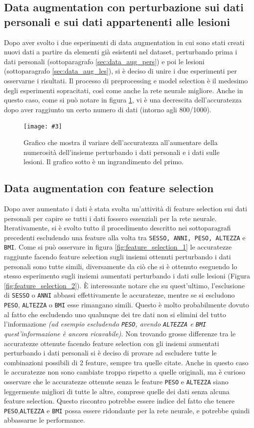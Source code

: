 \documentclass[12pt, twoside, letterpaper]{report}
\newcommand{\img}[4] {
	\begin{figure}
		\centering
		\texttt{[image: \#3]}\\
		\caption{#1}
		\label{fig:#4}
	\end{figure}
}
\begin{document}
		\subsection{Data augmentation con perturbazione sui dati personali e sui dati appartenenti alle lesioni}
			Dopo aver svolto i due esperimenti di data augmentation in cui sono stati creati nuovi dati a partire da elementi già esistenti nel dataset, perturbando prima i dati personali (sottoparagrafo \ref{sec:data_aug_pers}) e poi le lesioni (sottoparagrafo \ref{sec:data_aug_les}), si è deciso di unire i due esperimenti per osservarne i risultati. Il processo di preprocessing e model selection è il medesimo degli esperimenti sopracitati, così come anche la rete neurale migliore. Anche in questo caso, come si può notare in figura \ref{fig:acc_data_aug_both}, vi è una decrescita dell'accuratezza dopo aver raggiunto un certo numero di dati (intorno agli 800/1000).
			\img{Grafico che mostra il variare dell'accuratezza all'aumentare della numerosità dell'insieme perturbando i dati personali e i dati sulle lesioni. Il grafico sotto è un ingrandimento del primo.}{0.35}{acc_data_aug_both_.png}{acc_data_aug_both}
			
		\subsection{Data augmentation con feature selection} Dopo aver aumentato i dati è stata svolta un'attività di feature selection sui dati personali per capire se tutti i dati fossero essenziali per la rete neurale. Iterativamente, si è svolto tutto il procedimento descritto nei sottoparagrafi precedenti escludendo una feature alla volta tra \texttt{SESSO, ANNI, PESO, ALTEZZA} e \texttt{BMI}. Come si può osservare in figura \ref{fig:feature_selection_1} le accuratezze raggiunte facendo feature selection sugli insiemi ottenuti perturbando i dati personali sono tutte simili, diversamente da ciò che si è ottenuto eseguendo lo stesso esperimento sugli insiemi aumentati perturbando i dati sulle lesioni (Figura \ref{fig:feature_selection_2}). È interessante notare che su quest'ultimo, l'esclusione di \texttt{SESSO} o \texttt{ANNI} abbassi effettivamente le accuratezze, mentre se si escludono \texttt{PESO}, \texttt{ALTEZZA} o \texttt{BMI} esse rimangano simili. Questo è molto probabilmente dovuto al fatto che escludendo uno qualunque dei tre dati non si elimini del tutto l'informazione \textit{(ad esempio escludendo \texttt{PESO}, avendo \texttt{ALTEZZA} e \texttt{BMI} quest'informazione è ancora ricavabile)}. Non trovando grosse differenze tra le accuratezze ottenute facendo feature selection con gli insiemi aumentati perturbando i dati personali si è deciso di provare ad escludere tutte le combinazioni possibili di 2 feature, sempre tra quelle citate. Anche in questo caso le accuratezze non sono cambiate troppo rispetto a quelle originali, ma è curioso osservare che le accuratezze ottenute senza le feature \texttt{PESO} e \texttt{ALTEZZA} siano leggermente migliori di tutte le altre, comprese quelle dei dati senza alcuna feature selection. Questo riscontro potrebbe essere indice del fatto che tenere \texttt{PESO},\texttt{ALTEZZA} e \texttt{BMI} possa essere ridondante per la rete neurale, e potrebbe quindi abbassarne le performance. 
\end{document}
